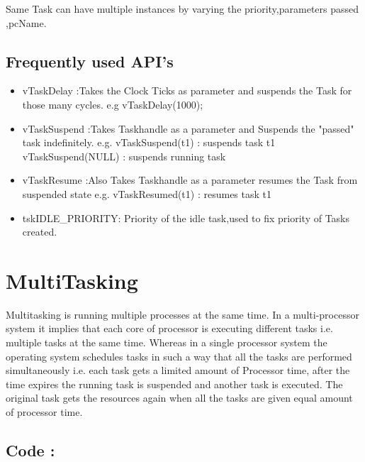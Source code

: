 \documentclass[11pt,a4paper]{article}
\begin{document}
	 Same Task can have multiple instances by varying the priority,parameters passed ,pcName.
	
	\subsection{Frequently used API's}
	\begin{itemize}
		\item vTaskDelay :Takes the Clock Ticks as parameter and suspends the Task for those many cycles. e.g vTaskDelay(1000);
		
		\item vTaskSuspend :Takes Taskhandle as a parameter and Suspends the "passed" task indefinitely.
		e.g. vTaskSuspend(t1) : suspends task t1 
		     vTaskSuspend(NULL) : suspends running task
		
		\item vTaskResume :Also Takes Taskhandle as a parameter resumes the Task from suspended state
		e.g. vTaskResumed(t1) : resumes task t1 
		
		\item tskIDLE\_PRIORITY: Priority of the idle task,used to fix priority of Tasks created.
	\end{itemize}
	\newpage
	
	\section{MultiTasking}
	Multitasking is running multiple processes at the same time.
	In a multi-processor system it implies that each core of processor is executing different tasks i.e. multiple tasks at the same time.
	Whereas in a single processor system the operating system schedules tasks in such a way that all the tasks are performed simultaneously i.e. each task gets a limited amount of Processor time, after the time expires the running task is suspended and another task is executed. The original task gets the resources again when all the tasks are given equal amount of processor time. 
	
	\subsection{Code :}
	
	
\end{document}
